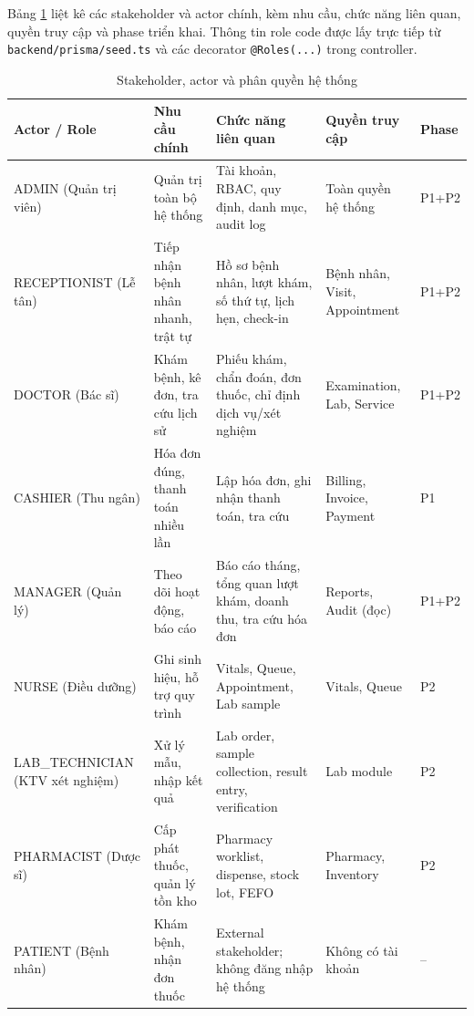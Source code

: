 Bảng \ref{tab:srs-stakeholders} liệt kê các stakeholder và actor chính, kèm nhu cầu, chức năng liên quan, quyền truy cập và phase triển khai. Thông tin role code được lấy trực tiếp từ \texttt{backend/prisma/seed.ts} và các decorator \texttt{@Roles(...)} trong controller.

\begin{longtable}{|p{2.2cm}|p{2.5cm}|p{3.4cm}|p{2.6cm}|p{1.3cm}|}
\caption{Stakeholder, actor và phân quyền hệ thống}
\label{tab:srs-stakeholders}\\
\hline
\textbf{Actor / Role} & \textbf{Nhu cầu chính} & \textbf{Chức năng liên quan} & \textbf{Quyền truy cập} & \textbf{Phase} \\
\hline
\endhead
\hline
\endfoot
ADMIN \newline (Quản trị viên) & Quản trị toàn bộ hệ thống & Tài khoản, RBAC, quy định, danh mục, audit log & Toàn quyền hệ thống & P1+P2 \\
\hline
RECEPTIONIST \newline (Lễ tân) & Tiếp nhận bệnh nhân nhanh, trật tự & Hồ sơ bệnh nhân, lượt khám, số thứ tự, lịch hẹn, check-in & Bệnh nhân, Visit, Appointment & P1+P2 \\
\hline
DOCTOR \newline (Bác sĩ) & Khám bệnh, kê đơn, tra cứu lịch sử & Phiếu khám, chẩn đoán, đơn thuốc, chỉ định dịch vụ/xét nghiệm & Examination, Lab, Service & P1+P2 \\
\hline
CASHIER \newline (Thu ngân) & Hóa đơn đúng, thanh toán nhiều lần & Lập hóa đơn, ghi nhận thanh toán, tra cứu & Billing, Invoice, Payment & P1 \\
\hline
MANAGER \newline (Quản lý) & Theo dõi hoạt động, báo cáo & Báo cáo tháng, tổng quan lượt khám, doanh thu, tra cứu hóa đơn & Reports, Audit (đọc) & P1+P2 \\
\hline
NURSE \newline (Điều dưỡng) & Ghi sinh hiệu, hỗ trợ quy trình & Vitals, Queue, Appointment, Lab sample & Vitals, Queue & P2 \\
\hline
LAB\_TECHNICIAN \newline (KTV xét nghiệm) & Xử lý mẫu, nhập kết quả & Lab order, sample collection, result entry, verification & Lab module & P2 \\
\hline
PHARMACIST \newline (Dược sĩ) & Cấp phát thuốc, quản lý tồn kho & Pharmacy worklist, dispense, stock lot, FEFO & Pharmacy, Inventory & P2 \\
\hline
PATIENT \newline (Bệnh nhân) & Khám bệnh, nhận đơn thuốc & External stakeholder; không đăng nhập hệ thống & Không có tài khoản & -- \\
\hline
\end{longtable}

